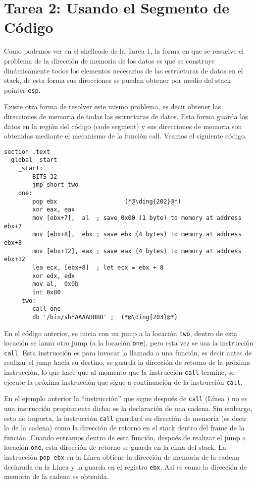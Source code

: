 \section{Tarea 2: Usando el Segmento de Código}

Como podemos ver en el shellcode de la Tarea 1, la forma en que se resuelve el problema de la dirección de memoria de los datos es que se construye dinámicamente todos los elementos necesarios de las estructuras de datos en el stack, de esta forma sus direcciones se puedan obtener por medio del stack pointer \texttt{esp}.

Existe otra forma de resolver este mismo problema, es decir obtener las direcciones de memoria de todas las estructuras de datos. Esta forma guarda los datos en la región del código (code segment) y sus direcciones de memoria son obtenidas mediante el mecanismo de la función call. Veamos el siguiente código.


\begin{lstlisting}[caption={\texttt{mysh2.s}}]
section .text
  global _start
    _start:
        BITS 32
        jmp short two
    one:
        pop ebx                   (*@\ding{202}@*)
        xor eax, eax
        mov [ebx+7],  al  ; save 0x00 (1 byte) to memory at address ebx+7
        mov [ebx+8],  ebx ; save ebx (4 bytes) to memory at address ebx+8
        mov [ebx+12], eax ; save eax (4 bytes) to memory at address ebx+12
        lea ecx, [ebx+8]  ; let ecx = ebx + 8
        xor edx, edx
        mov al,  0x0b
        int 0x80
     two:
        call one
        db '/bin/sh*AAAABBBB' ;  (*@\ding{203}@*)
\end{lstlisting}

En el código anterior, se inicia con un jump a la locación \texttt{two}, dentro de esta locación se lanza otro jump (a la locación \texttt{one}), pero esta vez se usa la instrucción \texttt{call}. Esta instrucción es para invocar la llamada a una función, es decir antes de realizar el jump hacia su destino, se guarda la dirección de retorno de la próxima instrucción, lo que hace que al momento que la instrucción \texttt{call} termine, se ejecute la próxima instrucción que sigue a continuación de la instrucción \texttt{call}.

En el ejemplo anterior la ``instrucción'' que sigue después de \texttt{call} (Línea  ) no es una instrucción propiamente dicha; es la declaración de una cadena. Sin embargo, esto no importa, la instrucción \texttt{call} guardará su dirección de memoria (es decir la de la cadena) como la dirección de retorno en el stack dentro del frame de la función. Cuando entramos dentro de esta función, después de realizar el jump a locación \texttt{one}, esta dirección de retorno se guarda en la cima del stack. La instrucción \texttt{pop ebx} en la Línea  obtiene la dirección de memoria de la cadena declarada en la Línea  y la guarda en el registro \texttt{ebx}. Así es como la dirección de memoria de la cadena es obtenida.

